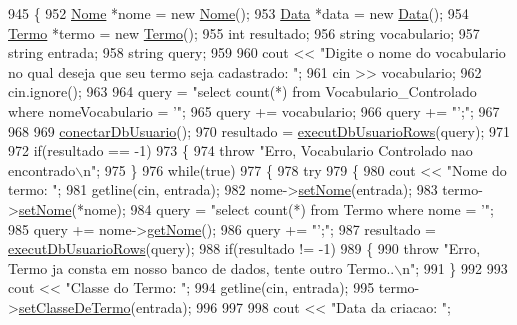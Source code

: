 \begin{DoxyCode}
945 \{
952   \mbox{\hyperlink{class_nome}{Nome}} *nome = \textcolor{keyword}{new} \mbox{\hyperlink{class_nome}{Nome}}();
953   \mbox{\hyperlink{class_data}{Data}} *data = \textcolor{keyword}{new} \mbox{\hyperlink{class_data}{Data}}();
954   \mbox{\hyperlink{class_termo}{Termo}} *termo = \textcolor{keyword}{new} \mbox{\hyperlink{class_termo}{Termo}}();
955 \textcolor{keywordtype}{int} resultado;
956   \textcolor{keywordtype}{string} vocabulario;
957   \textcolor{keywordtype}{string} entrada;
958   \textcolor{keywordtype}{string} query;
959 
960   cout << \textcolor{stringliteral}{"Digite o nome do vocabulario no qual deseja que seu termo seja cadastrado: "};
961   cin >> vocabulario;
962   cin.ignore();
963 
964   query = \textcolor{stringliteral}{"select count(*) from Vocabulario\_Controlado where nomeVocabulario = '"};
965   query += vocabulario;
966   query += \textcolor{stringliteral}{"';"};
967 
968 
969   \mbox{\hyperlink{comando_sql_8cpp_a4f89ddcbc4cf8f2587d89f72f8c7900d}{conectarDbUsuario}}();
970   resultado = \mbox{\hyperlink{comando_sql_8cpp_af54952694f2fa7d76f969fb74b853cb9}{executDbUsuarioRows}}(query);
971 
972   \textcolor{keywordflow}{if}(resultado == -1)
973   \{
974     \textcolor{keywordflow}{throw} \textcolor{stringliteral}{"Erro, Vocabulario Controlado nao encontrado\(\backslash\)n"};
975   \}
976 \textcolor{keywordflow}{while}(\textcolor{keyword}{true})
977 \{
978   \textcolor{keywordflow}{try}
979   \{
980     cout << \textcolor{stringliteral}{"Nome do termo: "};
981     getline(cin, entrada);
982     nome->\mbox{\hyperlink{class_nome_a83b9f56ec9f86f4b976846f4c5c65b30}{setNome}}(entrada);
983     termo->\mbox{\hyperlink{class_termo_a43246196cccd6fa074731e93ac15f07a}{setNome}}(*nome);
984     query = \textcolor{stringliteral}{"select count(*) from Termo where nome = '"};
985     query += nome->\mbox{\hyperlink{class_nome_aad41176173eec20cbbae1576447a3697}{getNome}}();
986     query += \textcolor{stringliteral}{"';"};
987     resultado = \mbox{\hyperlink{comando_sql_8cpp_af54952694f2fa7d76f969fb74b853cb9}{executDbUsuarioRows}}(query);
988     \textcolor{keywordflow}{if}(resultado != -1)
989     \{
990       \textcolor{keywordflow}{throw} \textcolor{stringliteral}{"Erro, Termo ja consta em nosso banco de dados, tente outro Termo..\(\backslash\)n"};
991     \}
992 
993     cout << \textcolor{stringliteral}{"Classe do Termo: "};
994     getline(cin, entrada);
995     termo->\mbox{\hyperlink{class_termo_a8c32e501b39e008ea369650e3eb196b1}{setClasseDeTermo}}(entrada);
996 
997 
998     cout << \textcolor{stringliteral}{"Data da criacao: "};

\end{DoxyCode}
